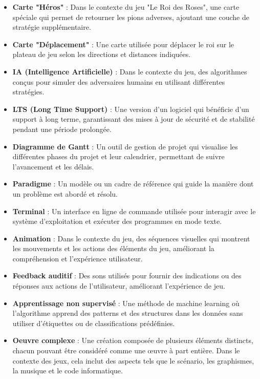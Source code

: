 \begin{itemize}
    \item \textbf{Carte "Héros"} : Dans le contexte du jeu "Le Roi des Roses", une carte spéciale qui permet de retourner les pions adverses, ajoutant une couche de stratégie supplémentaire.

    \item \textbf{Carte "Déplacement"} : Une carte utilisée pour déplacer le roi sur le plateau de jeu selon les directions et distances indiquées.

    \item \textbf{IA (Intelligence Artificielle)} : Dans le contexte du jeu, des algorithmes conçus pour simuler des adversaires humains en utilisant différentes stratégies.

    \item \textbf{LTS (Long Time Support)} : Une version d'un logiciel qui bénéficie d'un support à long terme, garantissant des mises à jour de sécurité et de stabilité pendant une période prolongée.

    \item \textbf{Diagramme de Gantt} : Un outil de gestion de projet qui visualise les différentes phases du projet et leur calendrier, permettant de suivre l'avancement et les délais.

    \item \textbf{Paradigme} : Un modèle ou un cadre de référence qui guide la manière dont un problème est abordé et résolu.

    \item \textbf{Terminal} : Un interface en ligne de commande utilisée pour interagir avec le système d'exploitation et exécuter des programmes en mode texte.

    \item \textbf{Animation} : Dans le contexte du jeu, des séquences visuelles qui montrent les mouvements et les actions des éléments du jeu, améliorant la compréhension et l'expérience utilisateur.

    \item \textbf{Feedback auditif} : Des sons utilisés pour fournir des indications ou des réponses aux actions de l'utilisateur, améliorant l'expérience de jeu.

    \item \textbf{Apprentissage non supervisé} : Une méthode de machine learning où l'algorithme apprend des patterns et des structures dans les données sans utiliser d'étiquettes ou de classifications prédéfinies.

    \item \textbf{Oeuvre complexe} : Une création composée de plusieurs éléments distincts, chacun pouvant être considéré comme une œuvre à part entière. Dans le contexte des jeux, cela inclut des aspects tels que le scénario, les graphismes, la musique et le code informatique.


\end{itemize}
